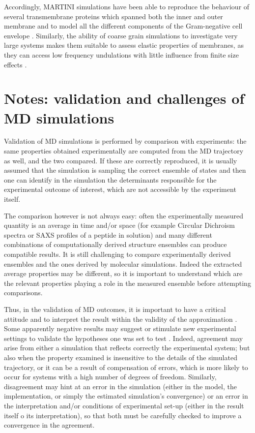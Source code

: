 \documentclass[graybox]{svmult}
\begin{document}
Accordingly, MARTINI simulations have been able to reproduce the behaviour of several transmembrane proteins which spanned both the inner and outer membrane \cite{Hsu2017} and to model all the different components of the Gram-negative cell envelope \cite{Khalid2019}.
%
Similarly, the ability of coarse grain simulations to investigate very large systems makes them suitable to assess elastic properties of membranes, as they can access low frequency undulations with little influence from finite size effects \cite{Fowler2016}.


\section{Notes: validation and challenges of MD simulations}

Validation of MD simulations is performed by comparison with experiments: the same properties obtained experimentally are computed from the MD trajectory as well, and the two compared. If these are correctly reproduced, it is usually assumed that the simulation is sampling the correct ensemble of states and then one can identify in the simulation the determinants responsible for the experimental outcome of interest, which are not accessible by the experiment itself.

The comparison however is not always easy: often the experimentally measured quantity is an average in time and/or space (for example Circular Dichroism spectra or SAXS profiles of a peptide in solution) and many different combinations of computationally derived structure ensembles can produce compatible results. It is still challenging to compare experimentally derived ensembles and the ones derived by molecular simulations. Indeed the extracted average properties may be different, so it is important to understand which are the relevant properties playing a role in the measured ensemble before attempting comparisons.

Thus, in the validation of MD outcomes, it is important to have a critical attitude and to interpret the result within the validity of the approximation \cite{VanGunsteren2008}. Some apparently negative results may suggest or stimulate new experimental settings to validate the hypotheses one was set to test \cite{Goncalves2013,Meissner2014}.
%
Indeed, agreement may arise from either a simulation that reflects correctly the experimental system; but also when the property examined is insensitive to the details of the simulated trajectory, or it can be a result of compensation of errors, which is more likely to  occur for systems with a high number of degrees of freedom.
%
Similarly, disagreement may hint at an error in the simulation (either in the model, the implementation, or simply the estimated simulation's convergence) or an error in the interpretation and/or conditions of experimental set-up (either in the result itself o its interpretation), so that both must be carefully checked to improve a convergence in the agreement.
\end{document}
